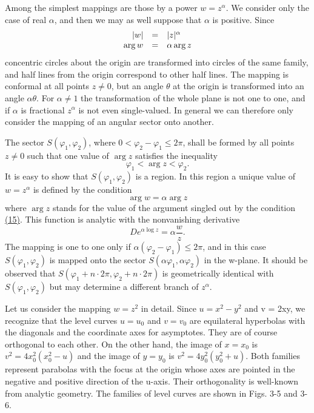 Among the simplest mappings are those by a power $w = z^{\alpha}$. We consider only the case of real $\alpha$, and then we may as well suppose that $\alpha$ is positive. Since
\begin{equation*}
\begin{array}{r c l} | w | & = & | z | ^ {\alpha} \\ \arg w & = & \alpha \arg z \end{array}
\end{equation*}
concentric circles about the origin are transformed into circles of the same family, and half lines from the origin correspond to other half lines. The mapping is conformal at all points $z \neq 0$, but an angle $\theta$ at the origin is transformed into an angle $\alpha\theta$. For $\alpha \neq 1$ the transformation of the whole plane is not one to one, and if $\alpha$ is fractional $z^{\alpha}$ is not even single-valued. In general we can therefore only consider the mapping of an angular sector onto another.

The sector $S(\varphi_1, \varphi_2)$, where $0 < \varphi_2 - \varphi_1 \leq 2\pi$, shall be formed by all points $z \neq 0$ such that one value of $\arg z$ satisfies the inequality
\begin{equation*}
\varphi_ {1} <   \arg z <   \varphi_ {2}.\tag{15}\label{eq:3.15}
\end{equation*}
It is easy to show that $S(\varphi_1, \varphi_2)$ is a region. In this region a unique value of $w = z^\alpha$ is defined by the condition
\begin{equation*}
\arg w = \alpha \arg z
\end{equation*}
where $\arg z$ stands for the value of the argument singled out by the condition \hyperref[eq:3.15]{(15)}. This function is analytic with the nonvanishing derivative
\begin{equation*}
D e ^ {\alpha \log z} = \alpha \frac {w}{z}.
\end{equation*}
The mapping is one to one only if $\alpha(\varphi_{2}-\varphi_{1})\leq2\pi$, and in this case $S(\varphi_{1},\varphi_{2})$ is mapped onto the sector $S(\alpha\varphi_{1},\alpha\varphi_{2})$ in the w-plane. It should be observed that $S(\varphi_{1}+n\cdot2\pi,\varphi_{2}+n\cdot2\pi)$ is geometrically identical with $S(\varphi_{1},\varphi_{2})$ but may determine a different branch of $z^{\alpha}$.

Let us consider the mapping $w = z^{2}$ in detail. Since $u = x^{2} - y^{2}$ and v = 2xy, we recognize that the level curves $u = u_{0}$ and $v = v_{0}$ are equilateral hyperbolas with the diagonals and the coordinate axes for asymptotes. They are of course orthogonal to each other. On the other hand, the image of $x = x_{0}$ is $v^{2} = 4x_{0}^{2}(x_{0}^{2} - u)$ and the image of $y = y_{0}$ is $v^{2} = 4y_{0}^{2}(y_{0}^{2} + u)$. Both families represent parabolas with the focus at the origin whose axes are pointed in the negative and positive direction of the u-axis. Their orthogonality is well-known from analytic geometry. The families of level curves are shown in Figs. 3-5 and 3-6.


